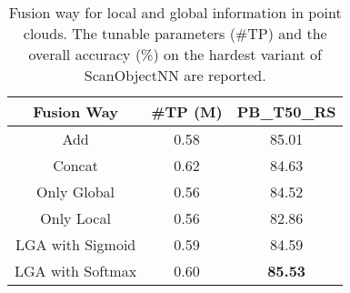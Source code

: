 \begin{table}[!t]
\scriptsize
\setlength{\tabcolsep}{7.3mm}
\centering
\caption{Fusion way for local and global information in point clouds. The tunable parameters (\#TP) and the overall accuracy (\%) on the hardest variant of ScanObjectNN\cite{uy2019revisiting} are reported.}
\label{tab:fusion_way}

\begin{tabular}{ccc}
\toprule
Fusion Way & \#TP (M) & PB\_T50\_RS \\
\midrule
Add & 0.58 & 85.01 \\
Concat & 0.62 & 84.63 \\
Only Global & 0.56 & 84.52 \\
Only Local & 0.56 & 82.86 \\
LGA with Sigmoid & 0.59 & 84.59 \\
\rowcolor{linecolor!40}LGA with Softmax & 0.60 & \textbf{85.53} \\
\bottomrule
\end{tabular}
\end{table}
